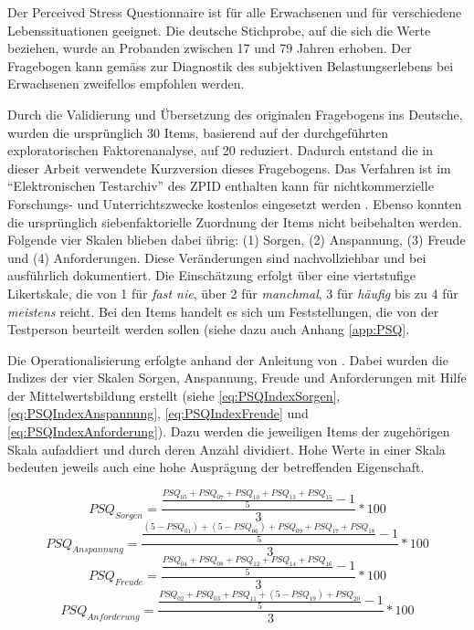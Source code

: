Der Perceived Stress Questionnaire \cite{Fliege2001} ist für alle Erwachsenen und für verschiedene Lebenssituationen geeignet. Die deutsche Stichprobe, auf die sich die Werte beziehen, wurde an Probanden zwischen 17 und 79 Jahren erhoben. Der Fragebogen kann gemäss  zur Diagnostik des subjektiven Belastungserlebens bei Erwachsenen zweifellos empfohlen werden.

Durch die Validierung und Übersetzung des originalen Fragebogens ins Deutsche, wurden die ursprünglich 30 Items, basierend auf der durchgeführten exploratorischen Faktorenanalyse, auf 20 reduziert. Dadurch entstand die in dieser Arbeit verwendete Kurzversion dieses Fragebogens. Das Verfahren ist im \enquote{Elektronischen Testarchiv} des ZPID enthalten kann für nichtkommerzielle Forschungs- und Unterrichtszwecke kostenlos eingesetzt werden \cite{ZPID}. Ebenso konnten die ursprünglich siebenfaktorielle Zuordnung der Items nicht beibehalten werden. Folgende vier Skalen blieben dabei übrig: (1) Sorgen, (2) Anspannung, (3) Freude und (4) Anforderungen. Diese Veränderungen sind nachvollziehbar und bei  ausführlich dokumentiert. Die Einschätzung erfolgt über eine viertstufige Likertskale, die von 1 für \textit{fast nie}, über 2 für \textit{manchmal}, 3 für \textit{häufig} bis zu 4 für \textit{meistens} reicht. Bei den Items handelt es sich um Feststellungen, die von der Testperson beurteilt werden sollen (siehe dazu auch Anhang \ref{app:PSQ}. 

Die Operationalisierung erfolgte anhand der Anleitung von . Dabei wurden die Indizes der vier Skalen Sorgen, Anspannung, Freude und Anforderungen mit Hilfe der Mittelwertsbildung erstellt (siehe \ref{eq:PSQIndexSorgen}, \ref{eq:PSQIndexAnspannung}, \ref{eq:PSQIndexFreude} und \ref{eq:PSQIndexAnforderung}). Dazu werden die jeweiligen Items der zugehörigen Skala aufaddiert und durch deren Anzahl dividiert. Hohe Werte in einer Skala bedeuten jeweils auch eine hohe Ausprägung der betreffenden Eigenschaft.

\begin{equation}\label{eq:PSQIndexSorgen}
    PSQ_{Sorgen}=\frac{\frac{PSQ_{05}+PSQ_{07}+PSQ_{10}+PSQ_{13}+PSQ_{15}}{5}-1}{3}*100
\end{equation}
\begin{equation}\label{eq:PSQIndexAnspannung}
    PSQ_{Anspannung}=\frac{\frac{(5-PSQ_{01})+(5-PSQ_{06})+PSQ_{09}+PSQ_{17}+PSQ_{18}}{5}-1}{3}*100
\end{equation}
\begin{equation}\label{eq:PSQIndexFreude}
    PSQ_{Freude}=\frac{\frac{PSQ_{04}+PSQ_{08}+PSQ_{12}+PSQ_{14}+PSQ_{16}}{5}-1}{3}*100
\end{equation}
\begin{equation}\label{eq:PSQIndexAnforderung}
    PSQ_{Anforderung}=\frac{\frac{PSQ_{02}+PSQ_{03}+PSQ_{11}+(5-PSQ_{19})+PSQ_{20}}{5}-1}{3}*100
\end{equation}

